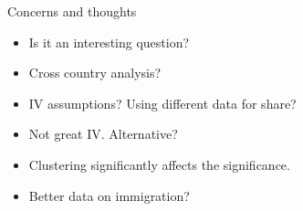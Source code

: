 \documentclass[notes,11pt, aspectratio=169]{beamer}
\begin{document}
\begin{frame}{Concerns and thoughts}
\begin{itemize}
	\item Is it an interesting question?
	\item Cross country analysis?
	\item IV assumptions? Using different data for share?
	\item Not great IV. Alternative?
	\item Clustering significantly affects the significance.
	\item Better data on immigration?
\end{itemize}	
\end{frame}
\end{document}
